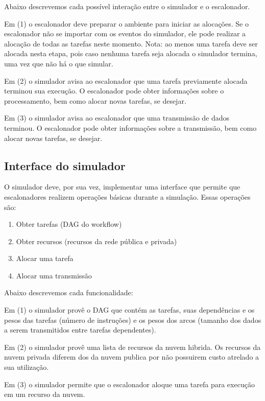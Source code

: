 \documentclass[a4paper,10pt]{article}
\begin{document}
Abaixo descrevemos cada possível interação entre o simulador e o escalonador.

Em (1) o escalonador deve preparar o ambiente para iniciar as alocações. Se o escalonador
não se importar com os eventos do simulador, ele pode realizar a alocação de todas as tarefas
neste momento. Nota: ao menos uma tarefa deve ser alocada nesta etapa, pois caso nenhuma tarefa
seja alocada o simulador termina, uma vez que não há o que simular.

Em (2) o simulador avisa ao escalonador que uma tarefa previamente alocada terminou sua execução.
O escalonador pode obter informações sobre o processamento, bem como alocar novas tarefas, se desejar.

Em (3) o simulador avisa ao escalonador que uma transmissão de dados terminou.
O escalonador pode obter informações sobre a transmissão, bem como alocar novas tarefas, se desejar.

\subsection{Interface do simulador}

O simulador deve, por sua vez, implementar uma interface que permite que escalonadores
realizem operações básicas durante a simulação. Essas operações são:

\begin{enumerate}

  \item Obter tarefas (DAG do workflow)
  \item Obter recursos (recursos da rede pública e privada)
  \item Alocar uma tarefa
  \item Alocar uma transmissão

\end{enumerate}

Abaixo descrevemos cada funcionalidade:

Em (1) o simulador provê o DAG que contém as tarefas, suas dependências e os pesos das tarefas (número
de instruções) e os pesos dos arcos (tamanho dos dados a serem transmitidos entre tarefas dependentes).

Em (2) o simulador provê uma lista de recursos da nuvem hibrida. Os recursos da nuvem privada diferem
dos da nuvem publica por não possuirem custo atrelado a sua utilização.

Em (3) o simulador permite que o escalonador aloque uma tarefa para execução em um recurso da nuvem.
\end{document}
